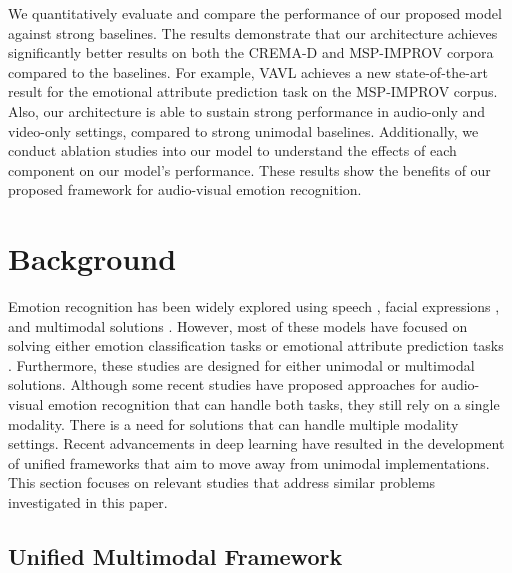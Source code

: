 \documentclass{article}
\begin{document}
We quantitatively evaluate and compare the performance of our proposed model against strong baselines. The results demonstrate that our architecture achieves significantly better results on both the CREMA-D \cite{Cao_2014_2} and MSP-IMPROV \cite{Busso_2017} corpora compared to the baselines. For example, VAVL achieves a new state-of-the-art result for the emotional attribute prediction task on the MSP-IMPROV corpus. Also, our architecture is able to sustain strong performance in audio-only and video-only settings, compared to strong unimodal baselines. Additionally, we conduct ablation studies into our model to understand the effects of each component on our model's performance. These results show the benefits of our proposed framework for audio-visual emotion recognition. 



\section{Background}
\label{sec:related}

Emotion recognition has been widely explored using speech \cite{Schuller_2018,Leem_2022, Parthasarathy_2017, Lotfian_2018, Lin_2020}, facial expressions \cite{Salman_2022, savchenko_2022}, and multimodal solutions \cite{Parthasarathy_2020_2,Li_2023, Yu_2023, Goncalves_2023}. However, most of these models have focused on solving either emotion classification tasks \cite{Goncalves_2023, Salman_2022,Lotfian_2018} or emotional attribute prediction tasks \cite{Leem_2022, Parthasarathy_2017}. Furthermore, these studies are designed for either unimodal or multimodal solutions. Although some recent studies \cite{Antoniadis_2021} have proposed approaches for audio-visual emotion recognition that can handle both tasks, they still rely on a single modality. There is a need for solutions that can handle multiple modality settings. Recent advancements in deep learning have resulted in the development of unified frameworks that aim to move away from unimodal implementations. This section focuses on relevant studies that address similar problems investigated in this paper. 




\subsection{Unified Multimodal Framework}
\label{ssec:uni_model}
\end{document}
